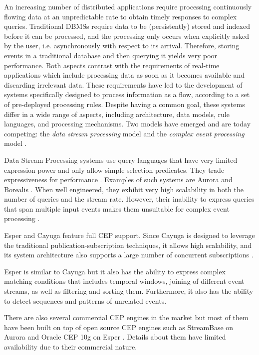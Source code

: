 \documentclass[book,type=bsc,colorback,accentcolor=tud8b,12pt,twoside]{tudthesis}
\begin{document}
An increasing number of distributed applications require processing continuously flowing data at an unpredictable rate to obtain timely responses to complex queries.  Traditional DBMSs require data to be (persistently) stored and indexed before it can be processed, and the processing only occurs when explicitly asked by the user, i.e. asynchronously with respect to its arrival.  Therefore, storing events in a traditional database and then querying it yields very poor performance.  Both aspects contrast with the requirements of real-time applications which include processing data as soon as it becomes available and discarding irrelevant data.  These requirements have led to the development of systems specifically designed to process information as a flow, according to a set of pre-deployed processing rules.  Despite having a common goal, these systems differ in a wide range of aspects, including architecture, data models, rule languages, and processing mechanisms.  Two models have emerged and are today competing: the \emph{data stream processing} model and the \emph{complex event processing} model \cite{Cugola:2012hh}.  

Data Stream Processing systems use query languages that have very limited expression power and only allow simple selection predicates.  They trade expressiveness for performance \cite{Suhothayan:2011ck}.  Examples of such systems are Aurora \cite{Abadi:2003kv} and Borealis \cite{Abadi:2005uy}.  When well engineered, they exhibit very high scalability in both the number of queries and the stream rate.  However, their inability to express queries that span multiple input events makes them unsuitable for complex event processing \cite{Demers:2007wj}.  

Esper \cite{Esper} and Cayuga \cite{Demers:2007wj} feature full CEP support.  Since Cayuga is designed to leverage the traditional publication-subscription techniques, it allows high scalability, and its system architecture also supports a large number of concurrent subscriptions \cite{Suhothayan:2011ck}.  

Esper is similar to Cayuga but it also has the ability to express complex matching conditions that includes temporal windows, joining of different event streams, as well as filtering and sorting them.  Furthermore, it also has the ability to detect sequences and patterns of unrelated events.  

There are also several commercial CEP engines in the market but most of them have been built on top of open source CEP engines such as StreamBase on Aurora and Oracle CEP 10g on Esper \cite{Fulop:2010uz}.  Details about them have limited availability due to their commercial nature.  
\end{document}
